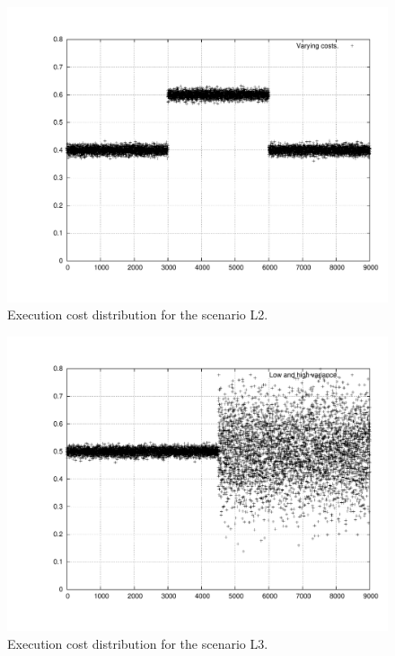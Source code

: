 \documentclass[times, 10pt,twocolumn]{article}
\begin{document}
\begin{figure}[h!t]
  \centering
  \includegraphics[scale=0.31]{trace-trifasico}
  \caption{Execution cost distribution for the scenario L2.}
  \label{fig:plotl2}
\end{figure}

\begin{figure}[h!t]
  \centering
  \includegraphics[scale=0.31]{trace-variance}
  \caption{Execution cost distribution for the scenario L3.}
  \label{fig:plotl3}
\end{figure}
\end{document}
